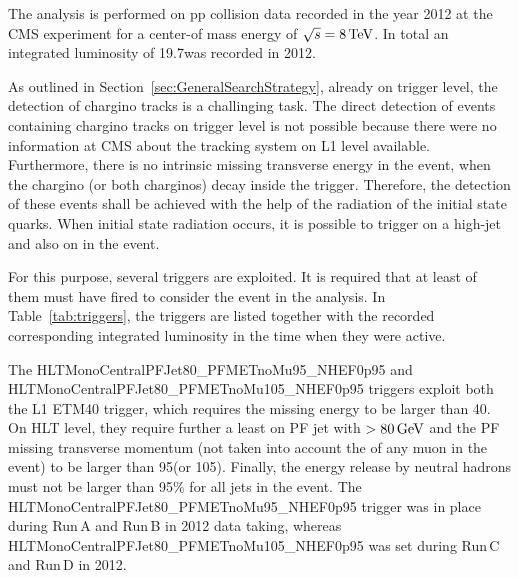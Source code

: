 The analysis is performed on pp collision data recorded in the year 2012 at the CMS experiment for a center-of mass energy of $\sqrt{s}=8\,\text{Te}\kern-0.06667em\text{V}$.
In total an integrated luminosity of 19.7\fbinv was recorded in 2012.

As outlined in Section~\ref{sec:GeneralSearchStrategy}, already on trigger level, the detection of chargino tracks is a challinging task.
The direct detection of events containing chargino tracks on trigger level is not possible because there were no information at CMS about the tracking system on L1 level available.
Furthermore, there is no intrinsic missing transverse energy in the event, when the chargino (or both charginos) decay inside the trigger.
Therefore, the detection of these events shall be achieved with the help of the radiation of the initial state quarks.
When initial state radiation occurs, it is possible to trigger on a high-\pt jet and also on \met in the event.

For this purpose, several triggers are exploited.
It is required that at least of them must have fired to consider the event in the analysis.
In Table~\ref{tab:triggers}, the triggers are listed together with the recorded corresponding integrated luminosity  in the time when they were active.
\renewcommand{\arraystretch}{1.5}
\begin{table}[!hbt]
\centering
\caption{\met and \met+jet triggers used in the analysis together with the recorded corresponding integrated luminosity in the time when they were in place.}
\label{tab:triggers}
\end{table}  

The HLTMonoCentralPFJet80\_PFMETnoMu95\_NHEF0p95 and HLTMonoCentralPFJet80\_PFMETnoMu105\_NHEF0p95 triggers exploit both the L1 ETM40 trigger, which requires the missing energy to be larger than 40\gev.
On HLT level, they require further a least on PF jet with \pt$>80\,\text{Ge}\kern-0.06667em\text{V}$ and the PF missing transverse momentum \met (not taken into account the \pt of any muon in the event) to be larger than 95\gev (or 105\gev).
Finally, the energy release by neutral hadrons must not be larger than 95\% for all jets in the event.
The HLTMonoCentralPFJet80\_PFMETnoMu95\_NHEF0p95 trigger was in place during Run\,A and Run\,B in 2012 data taking, whereas HLTMonoCentralPFJet80\_PFMETnoMu105\_NHEF0p95 was set during Run\,C and Run\,D in 2012.

